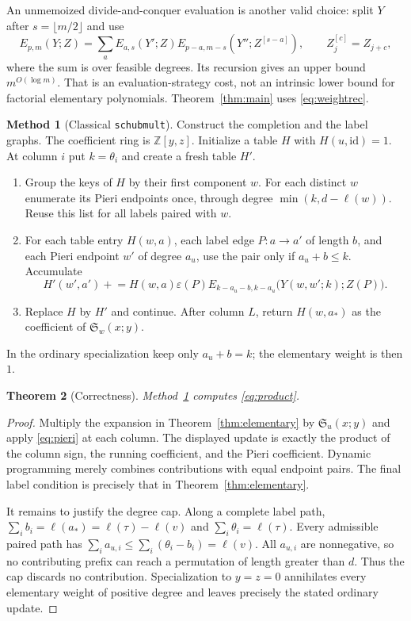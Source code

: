\documentclass{amsart}
\newtheorem{theorem}{Theorem}[section]
\theoremstyle{definition}
\newtheorem{method}[theorem]{Method}
\theoremstyle{remark}
\numberwithin{equation}{section}
\newcommand{\Sch}{\mathfrak S}
\newcommand{\id}{\mathrm{id}}
\newcommand{\alg}{\texttt{schubmult}}
\begin{document}
An unmemoized divide-and-conquer evaluation is another valid choice:
split $Y$ after $s=\lfloor m/2\rfloor$ and use
\[
 E_{p,m}(Y;Z)=\sum_a E_{a,s}(Y';Z)
     E_{p-a,m-s}(Y'';Z^{[s-a]}),\qquad
 Z^{[c]}_j=Z_{j+c},
\]
where the sum is over feasible degrees.
Its recursion gives an upper bound $m^{O(\log m)}$.
That is an evaluation-strategy cost, not an intrinsic lower bound
for factorial elementary polynomials.
Theorem~\ref{thm:main} uses \eqref{eq:weightrec}.

\begin{method}[Classical \alg]\label{method:product}
Construct the completion and the label graphs.
The coefficient ring is $\mathbb Z[y,z]$.
Initialize a table $H$ with $H(u,\id)=1$.
At column $i$ put $k=\theta_i$ and create a fresh table $H'$.
\begin{enumerate}
\item Group the keys of $H$ by their first component $w$.
For each distinct $w$ enumerate its Pieri endpoints once, through degree
$\min(k,d-\ell(w))$.
Reuse this list for all labels paired with $w$.
\item For each table entry $H(w,a)$, each label edge $P:a\to a'$
of length $b$, and each Pieri endpoint $w'$ of degree $a_u$,
use the pair only if $a_u+b\leq k$.
Accumulate
\[
 H'(w',a')\mathrel{+}=
  H(w,a)\varepsilon(P)
  E_{k-a_u-b,k-a_u}\bigl(Y(w,w';k);Z(P)\bigr).
\]
\item Replace $H$ by $H'$ and continue.
After column $L$, return $H(w,a_*)$ as the coefficient of $\Sch_w(x;y)$.
\end{enumerate}
In the ordinary specialization keep only $a_u+b=k$;
the elementary weight is then $1$.
\end{method}

\begin{theorem}[Correctness]\label{thm:correct}
Method~\ref{method:product} computes \eqref{eq:product}.
\end{theorem}
\begin{proof}
Multiply the expansion in Theorem~\ref{thm:elementary} by
$\Sch_u(x;y)$ and apply \eqref{eq:pieri} at each column.
The displayed update is exactly the product of the column sign,
the running coefficient, and the Pieri coefficient.
Dynamic programming merely combines contributions with equal endpoint
pairs.
The final label condition is precisely that in
Theorem~\ref{thm:elementary}.

It remains to justify the degree cap.
Along a complete label path,
$\sum_i b_i=\ell(a_*)=\ell(\tau)-\ell(v)$ and
$\sum_i\theta_i=\ell(\tau)$.
Every admissible paired path has
$\sum_i a_{u,i}\leq\sum_i(\theta_i-b_i)=\ell(v)$.
All $a_{u,i}$ are nonnegative, so no contributing prefix can reach
a permutation of length greater than $d$.
Thus the cap discards no contribution.
Specialization to $y=z=0$ annihilates every elementary weight of
positive degree and leaves precisely the stated ordinary update.
\end{proof}
\end{document}
